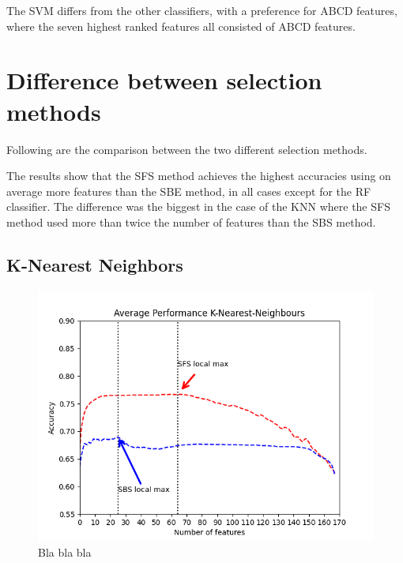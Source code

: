 \documentclass{kththesis}
\begin{document}
The SVM differs from the other classifiers, with a preference for ABCD features, where the seven highest ranked features all consisted of ABCD features.


\section{Difference between selection methods}

Following are the comparison between the two different selection methods. 


\begin{figure}[h!]
  \begin{center}
  \end{center}
\end{figure}

The results show that the SFS method achieves the highest accuracies using on average more features than the SBE method, in all cases except for the RF classifier. The difference was the biggest in the case of the KNN where the SFS method used more than twice the number of features than the SBS method.

\subsection{K-Nearest Neighbors}

\begin{figure}
  \begin{center}
    \includegraphics[scale=0.8]{./figures/Figure_2.png}
    \caption{Bla bla bla}
  \end{center}
\end{figure}
\end{document}
